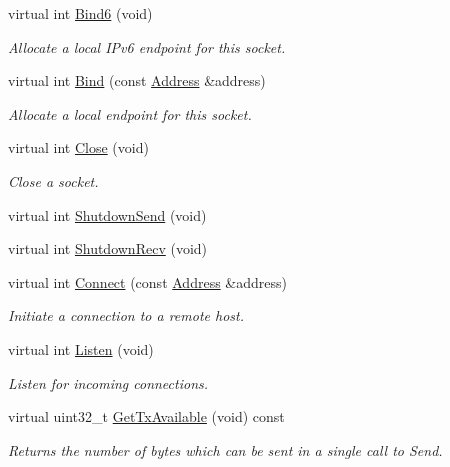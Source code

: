 \begin{DoxyCompactItemize}
virtual int \hyperlink{classns3_1_1UdpSocketImpl_a32b33c7a08d81248b1579882cebadcb6}{Bind6} (void)
\begin{DoxyCompactList}\small\item\em Allocate a local I\+Pv6 endpoint for this socket. \end{DoxyCompactList}\item 
virtual int \hyperlink{classns3_1_1UdpSocketImpl_a27d5153e9d75f95b1c04a74a7527cab1}{Bind} (const \hyperlink{classns3_1_1Address}{Address} \&address)
\begin{DoxyCompactList}\small\item\em Allocate a local endpoint for this socket. \end{DoxyCompactList}\item 
virtual int \hyperlink{classns3_1_1UdpSocketImpl_a9e81e9e088339d3608560afabf2d5f49}{Close} (void)
\begin{DoxyCompactList}\small\item\em Close a socket. \end{DoxyCompactList}\item 
virtual int \hyperlink{classns3_1_1UdpSocketImpl_a8a246f3ad4a45f0f397e2ccca71dc843}{Shutdown\+Send} (void)
\item 
virtual int \hyperlink{classns3_1_1UdpSocketImpl_a63d835c2b62497baa89b2a3ff7341fd4}{Shutdown\+Recv} (void)
\item 
virtual int \hyperlink{classns3_1_1UdpSocketImpl_a83f8fca9d8a21edeba0016d6de68fbf5}{Connect} (const \hyperlink{classns3_1_1Address}{Address} \&address)
\begin{DoxyCompactList}\small\item\em Initiate a connection to a remote host. \end{DoxyCompactList}\item 
virtual int \hyperlink{classns3_1_1UdpSocketImpl_a2a7b54e5e56efbd664e3e382bcfbb0f8}{Listen} (void)
\begin{DoxyCompactList}\small\item\em Listen for incoming connections. \end{DoxyCompactList}\item 
virtual uint32\+\_\+t \hyperlink{classns3_1_1UdpSocketImpl_a70191d0578ae26233f569631a26d608b}{Get\+Tx\+Available} (void) const 
\begin{DoxyCompactList}\small\item\em Returns the number of bytes which can be sent in a single call to Send. \end{DoxyCompactList}\item 

\end{DoxyCompactItemize}
